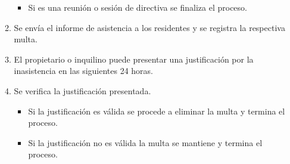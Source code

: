 \begin{itemize}
\begin{enumerate}
\begin{itemize}
            \item Si es una reunión o sesión de directiva se finaliza el proceso.
        \end{itemize}
        \item Se envía el informe de asistencia a los residentes y se registra la respectiva multa.
        \item El propietario o inquilino puede presentar una justificación por la inasistencia en las siguientes 24 horas.
        \item Se verifica la justificación presentada.
        \begin{itemize}
            \item Si la justificación es válida se procede a eliminar la multa y termina el proceso.
            \item Si la justificación no es válida la multa se mantiene y termina el proceso.
        \end{itemize}
    \end{enumerate}


\end{itemize}

